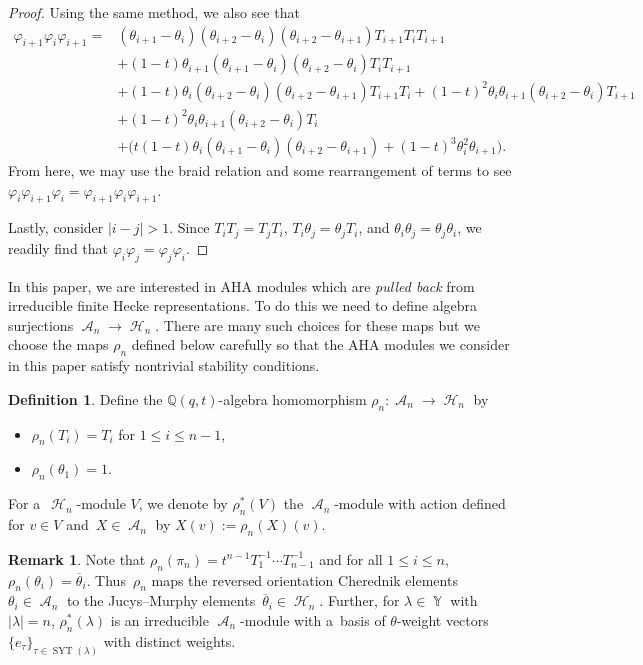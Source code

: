 \documentclass[pdftex]{sigma}
\numberwithin{equation}{section}
\theoremstyle{definition}
\newtheorem{Definition}[Theorem]{Definition}
\newtheorem{Remark}[Theorem]{Remark}
\DeclareMathOperator{\Par}{\mathbb{Y}}
\DeclareMathOperator{\SYT}{\mathrm{SYT}}
\DeclareMathOperator{\sH}{\mathscr{H}}
\DeclareMathOperator{\sA}{\mathscr{A}}
\begin{document}
\begin{proof}
Using the same method, we also see that
\begin{align*}
 \varphi_{i+1}\varphi_{i}\varphi_{i+1}= {}&(\theta_{i+1}-\theta_i)(\theta_{i+2}-\theta_i)(\theta_{i+2}-\theta_{i+1})T_{i+1}T_iT_{i+1} \\
&+ (1-t)\theta_{i+1}(\theta_{i+1}-\theta_i)(\theta_{i+2}-\theta_{i})T_iT_{i+1} \\
& + (1-t)\theta_i (\theta_{i+2}-\theta_{i})(\theta_{i+2}-\theta_{i+1})T_{i+1}T_i + (1-t)^2 \theta_{i}\theta_{i+1}(\theta_{i+2}-\theta_i)T_{i+1} \\
& + (1-t)^2 \theta_{i}\theta_{i+1}(\theta_{i+2}-\theta_i)T_{i} \\
& + \bigl( t(1-t)\theta_i(\theta_{i+1}-\theta_i)(\theta_{i+2}-\theta_{i+1}) + (1-t)^3 \theta_{i}^2 \theta_{i+1} \bigr).
\end{align*}
From here, we may use the braid relation  and some rearrangement of terms to see $\varphi_i\varphi_{i+1}\varphi_i = \varphi_{i+1}\varphi_{i}\varphi_{i+1}$.

Lastly, consider $|i - j| >1$. Since $T_iT_j = T_jT_i$, $T_i\theta_j = \theta_j T_i$, and $\theta_i\theta_j= \theta_j \theta_i$, we readily find that $\varphi_i\varphi_j = \varphi_j\varphi_i$.
\end{proof}

In this paper, we are interested in AHA modules which are \textit{pulled back} from irreducible finite Hecke representations. To do this we need to define algebra surjections $\sA_n \rightarrow \sH_n$. There are many such choices for these maps but we choose the maps $\rho_n$ defined below carefully so that the AHA modules we consider in this paper satisfy nontrivial stability conditions.

\begin{Definition}\label{map from affine to finite hecke}
 Define the $\mathbb{Q}(q,t)$-algebra homomorphism $\rho_n\colon\sA_n \rightarrow \sH_n$ by
 \begin{itemize}
\itemsep=0pt
 \item $\rho_n(T_i) = T_i$ for $1\leq i \leq n-1$,
 \item $\rho_n(\theta_1) = 1$.
 \end{itemize}
 For a~$\sH_n$-module $V$, we denote by $\rho_n^{*}(V)$ the $\sA_n$-module with action defined for $v \in V$ and~${X \in \sA_n}$ by $X(v) := \rho_n(X)(v)$.
\end{Definition}

\begin{Remark}
 Note that $\rho_n(\pi_n) = t^{n-1}T_1^{-1}\cdots T_{n-1}^{-1}$ and for all $1\leq i \leq n$, $\rho_n(\theta_i) = \overline{\theta}_i$. Thus~$\rho_n$ maps the reversed orientation Cherednik elements $\theta_i \in \sA_n$ to the Jucys--Murphy elements~${\overline{\theta}_i \in \sH_n}$. Further, for $\lambda \in \Par$ with $|\lambda| = n$, $\rho_n^{*}(\lambda)$ is an irreducible $\sA_n$-module with a~basis of $\theta$-weight vectors $\{e_{\tau}\}_{\tau \in \SYT(\lambda)}$ with distinct weights.
\end{Remark}
\end{document}
